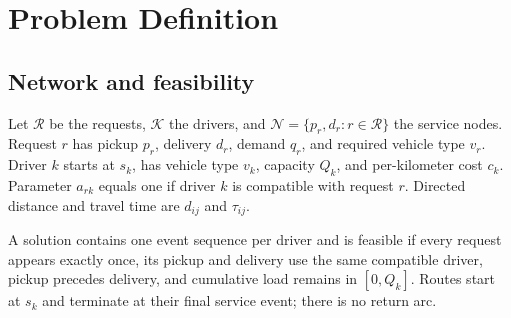 \documentclass[11pt,a4paper]{article}
\newcommand{\R}{\mathcal{R}}
\newcommand{\K}{\mathcal{K}}
\begin{document}
\section{Problem Definition}

\subsection{Network and feasibility}

Let $\R$ be the requests, $\K$ the drivers, and
$\mathcal{N}=\{p_r,d_r:r\in\R\}$ the service nodes. Request $r$ has pickup
$p_r$, delivery $d_r$, demand $q_r$, and required vehicle type $v_r$. Driver
$k$ starts at $s_k$, has vehicle type $v_k$, capacity $Q_k$, and
per-kilometer cost $c_k$. Parameter $a_{rk}$ equals one if driver $k$ is
compatible with request $r$. Directed distance and travel time are $d_{ij}$ and
$\tau_{ij}$.

A solution contains one event sequence per driver and is feasible if every
request appears exactly once, its pickup and delivery use the same compatible
driver, pickup precedes delivery, and cumulative load remains in
$[0,Q_k]$. Routes start at $s_k$ and terminate at their final service event;
there is no return arc.
\end{document}
